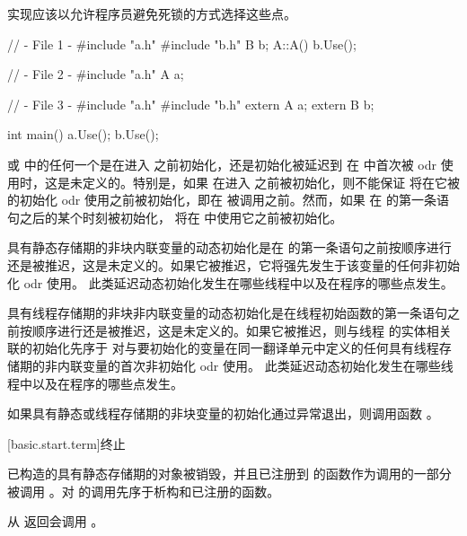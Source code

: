 \recommended
实现应该以允许程序员避免死锁的方式选择这些点。
\begin{example}
\begin{codeblock}
// - File 1 -
#include "a.h"
#include "b.h"
B b;
A::A() {
  b.Use();
}

// - File 2 -
#include "a.h"
A a;

// - File 3 -
#include "a.h"
#include "b.h"
extern A a;
extern B b;

int main() {
  a.Use();
  b.Use();
}
\end{codeblock}

 或  中的任何一个是在进入  之前初始化，还是初始化被延迟到  在  中首次被 odr 使用时，这是未定义的。特别是，如果  在进入  之前被初始化，则不能保证  将在它被  的初始化 odr 使用之前被初始化，即在  被调用之前。然而，如果  在  的第一条语句之后的某个时刻被初始化， 将在  中使用它之前被初始化。
\end{example}

\pnum
{}具有静态存储期的非块内联变量的动态初始化是在  的第一条语句之前按顺序进行还是被推迟，这是未定义的。如果它被推迟，它将强先发生于该变量的任何非初始化 odr 使用。
此类延迟动态初始化发生在哪些线程中以及在程序的哪些点发生。

\pnum
{}具有线程存储期的非块非内联变量的动态初始化是在线程初始函数的第一条语句之前按顺序进行还是被推迟，这是未定义的。如果它被推迟，则与线程  的实体相关联的初始化先序于  对与要初始化的变量在同一翻译单元中定义的任何具有线程存储期的非内联变量的首次非初始化 odr 使用。
此类延迟动态初始化发生在哪些线程中以及在程序的哪些点发生。

\pnum
如果具有静态或线程存储期的非块变量的初始化通过异常退出，则调用函数 。%

[basic.start.term]{终止}

\pnum
{}%
%
%
已构造的具有静态存储期的对象被销毁，并且已注册到  的函数作为调用的一部分被调用
%
%
。对  的调用先序于析构和已注册的函数。
\begin{note}
从  返回会调用 。
\end{note}

